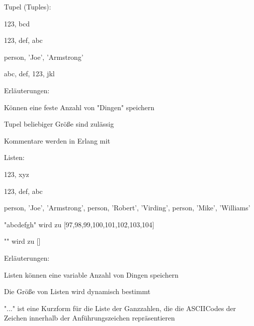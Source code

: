 \documentclass[10pt]{article}
\begin{document}
\begin{itemize*}
Tupel (Tuples):
\begin{itemize*}
  \item {123, bcd} %
  \item {123, def, abc}
  \item {person, 'Joe', 'Armstrong'}
  \item {abc, {def, 123}, jkl}
  \item {}
  \item Erläuterungen:
  \begin{itemize*}
    \item Können eine feste Anzahl von "Dingen" speichern
    \item Tupel beliebiger Größe sind zulässig
    \item Kommentare werden in Erlang mit %
  \end{itemize*}
\end{itemize*}

Listen:
\begin{itemize*}
  \item [123, xyz]
  \item [123, def, abc]
  \item [{person, 'Joe', 'Armstrong'}, {person, 'Robert', 'Virding'}, {person, 'Mike', 'Williams'}]
  \item "abcdefgh" wird zu [97,98,99,100,101,102,103,104]
  \item "" wird zu []
  \item Erläuterungen:
  \begin{itemize*}
    \item Listen können eine variable Anzahl von Dingen speichern
    \item Die Größe von Listen wird dynamisch bestimmt
    \item "..." ist eine Kurzform für die Liste der Ganzzahlen, die die ASCIICodes der Zeichen innerhalb der Anführungszeichen repräsentieren
  \end{itemize*}
\end{itemize*}


\end{itemize*}
\end{document}
